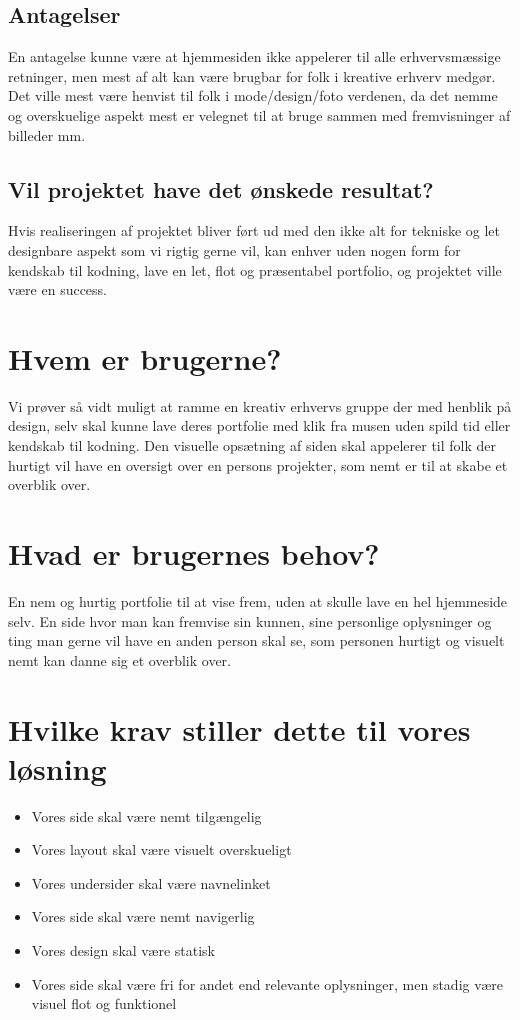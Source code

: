 \documentclass[a4paper,titlepage,fleqn,12pt]{article}
\begin{document}
\subsection{Antagelser}
En antagelse kunne være at hjemmesiden ikke appelerer til alle erhvervsmæssige retninger, men mest af alt kan være brugbar for folk i kreative erhverv medgør. Det ville mest være henvist til folk i mode/design/foto verdenen, da det nemme og overskuelige aspekt mest er velegnet til at bruge sammen med fremvisninger af billeder mm.

\subsection{Vil projektet have det ønskede resultat?}
Hvis realiseringen af projektet bliver ført ud med den ikke alt for tekniske og let designbare aspekt som vi rigtig gerne vil, kan enhver uden nogen form for kendskab til kodning, lave en let, flot og præsentabel portfolio, og projektet ville være en success.

\section{Hvem er brugerne?}
Vi prøver så vidt muligt at ramme en kreativ erhvervs gruppe der med henblik på design, selv skal kunne lave deres portfolie med klik fra musen uden spild tid eller kendskab til kodning. Den visuelle opsætning af siden skal appelerer til folk der hurtigt vil have en oversigt over en persons projekter, som nemt er til at skabe et overblik over.

\section{Hvad er brugernes behov?}
En nem og hurtig portfolie til at vise frem, uden at skulle lave en hel hjemmeside selv. En side hvor man kan fremvise sin kunnen, sine personlige oplysninger og ting man gerne vil have en anden person skal se, som personen hurtigt og visuelt nemt kan danne sig et overblik over.

\section{Hvilke krav stiller dette til vores løsning}
\begin{itemize}
	\item Vores side skal være nemt tilgængelig
	\item Vores layout skal være visuelt overskueligt
	\item Vores undersider skal være navnelinket
	\item Vores side skal være nemt navigerlig
	\item Vores design skal være statisk
	\item Vores side skal være fri for andet end relevante oplysninger, men stadig være visuel flot og funktionel
\end{itemize}
\end{document}
